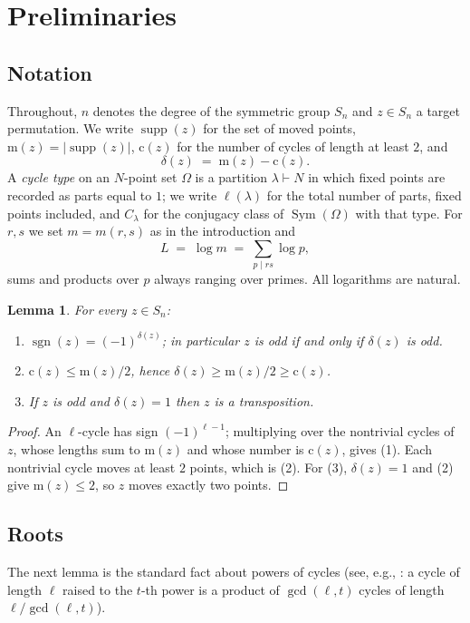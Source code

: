 \documentclass[11pt]{amsart}
\numberwithin{equation}{section}
\newtheorem{lemma}[theorem]{Lemma}
\theoremstyle{remark}
\newcommand{\Sym}{\operatorname{Sym}}
\newcommand{\supp}{\operatorname{supp}}
\newcommand{\sgn}{\operatorname{sgn}}
\newcommand{\md}{\mathrm{m}}   %
\newcommand{\cy}{\mathrm{c}}   %
\begin{document}
\section{Preliminaries}\label{sec:prelim}

\subsection{Notation}
Throughout, $n$ denotes the degree of the symmetric group $S_n$ and $z\in S_n$ a
target permutation. We write $\supp(z)$ for the set of moved points,
$\md(z)=|\supp(z)|$, $\cy(z)$ for the number of cycles of length at least $2$, and
\[
\delta(z)\;=\;\md(z)-\cy(z).
\]
A \emph{cycle type} on an $N$-point set $\Omega$ is a partition $\lambda\vdash N$
in which fixed points are recorded as parts equal to $1$; we write $\ell(\lambda)$
for the total number of parts, fixed points included, and $C_\lambda$ for the
conjugacy class of $\Sym(\Omega)$ with that type. For $r,s$ we set
$m=m(r,s)$ as in the introduction and
\[
L\;=\;\log m\;=\;\sum_{p\mid rs}\log p ,
\]
sums and products over $p$ always ranging over primes. All logarithms are natural.

\begin{lemma}\label{lem:elem}
For every $z\in S_n$:
\begin{enumerate}
\item $\sgn(z)=(-1)^{\delta(z)}$; in particular $z$ is odd if and only if
$\delta(z)$ is odd.
\item $\cy(z)\le \md(z)/2$, hence $\delta(z)\ge \md(z)/2\ge \cy(z)$.
\item If $z$ is odd and $\delta(z)=1$ then $z$ is a transposition.
\end{enumerate}
\end{lemma}

\begin{proof}
An $\ell$-cycle has sign $(-1)^{\ell-1}$; multiplying over the nontrivial cycles
of $z$, whose lengths sum to $\md(z)$ and whose number is $\cy(z)$, gives (1).
Each nontrivial cycle moves at least $2$ points, which is (2). For (3),
$\delta(z)=1$ and (2) give $\md(z)\le 2$, so $z$ moves exactly two points.
\end{proof}

\subsection{Roots}
The next lemma is the standard fact about powers of cycles (see, e.g.,
\cite[\S4.8]{Wilf}: a cycle of length $\ell$ raised to the $t$-th power is a
product of $\gcd(\ell,t)$ cycles of length $\ell/\gcd(\ell,t)$).
\end{document}
